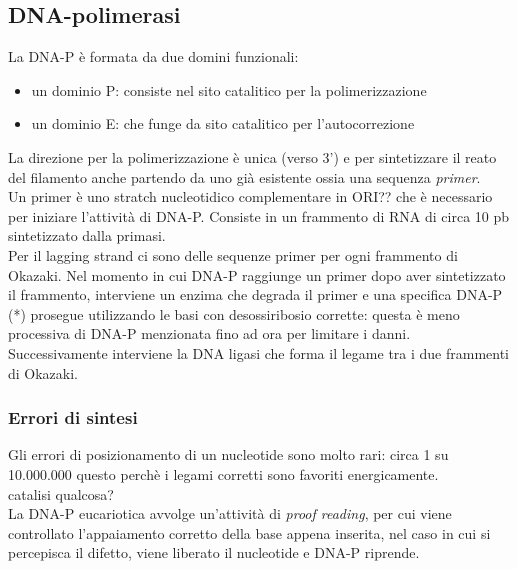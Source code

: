        \subsection{DNA-polimerasi}
            La DNA-P è formata da due domini funzionali:
            \begin{itemize}
                \item un dominio P: consiste nel sito catalitico per la polimerizzazione
                \item un dominio E: che funge da sito catalitico per l'autocorrezione
            \end{itemize}
            La direzione per la polimerizzazione è unica (verso 3') e per sintetizzare il reato del filamento anche partendo da uno già esistente ossia una sequenza \textit{primer}.  \\
            Un primer è uno stratch nucleotidico complementare in ORI?? che è necessario per iniziare l'attività di DNA-P. Consiste in un frammento di RNA di circa 10 pb sintetizzato dalla primasi.\\
            Per il lagging strand ci sono delle sequenze primer per ogni frammento di Okazaki. Nel momento in cui DNA-P raggiunge un primer dopo aver sintetizzato il frammento, interviene un enzima che degrada il primer e una specifica DNA-P (*) prosegue utilizzando le basi con desossiribosio corrette: questa è meno processiva di DNA-P menzionata fino ad ora per limitare i danni.
            Successivamente interviene la DNA ligasi che forma il legame tra i due frammenti di Okazaki.
            \subsubsection{Errori di sintesi}
                Gli errori di posizionamento di un nucleotide sono molto rari: circa 1 su 10.000.000 questo perchè i legami corretti sono favoriti energicamente.\\
                catalisi qualcosa?\\
                La DNA-P eucariotica avvolge un'attività di \textit{proof reading}, per cui viene controllato l'appaiamento corretto della base appena inserita, nel caso in cui si percepisca il difetto, viene liberato il nucleotide e DNA-P riprende.
                
